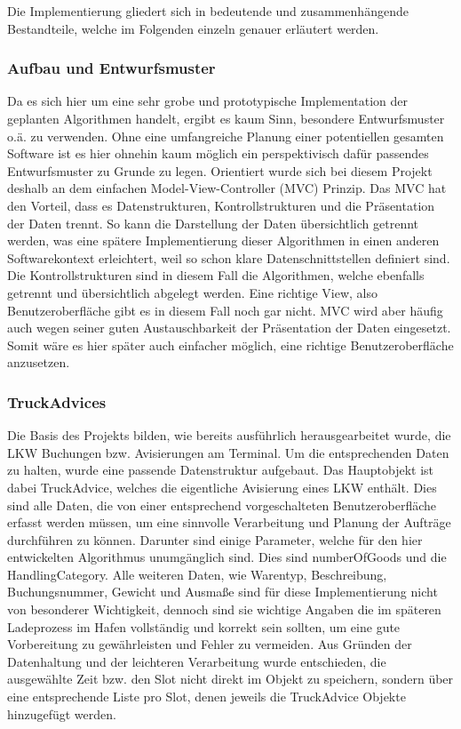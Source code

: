 Die Implementierung gliedert sich in bedeutende und zusammenhängende Bestandteile, welche im Folgenden einzeln genauer erläutert werden.


\subsubsection{Aufbau und Entwurfsmuster}


Da es sich hier um eine sehr grobe und prototypische Implementation der geplanten Algorithmen handelt, ergibt es kaum Sinn, besondere Entwurfsmuster o.ä. zu verwenden. Ohne eine umfangreiche Planung einer potentiellen gesamten Software ist es hier ohnehin kaum möglich ein perspektivisch dafür passendes Entwurfsmuster zu Grunde zu legen. Orientiert wurde sich bei diesem Projekt deshalb an dem einfachen Model-View-Controller (MVC) Prinzip. Das MVC hat den Vorteil, dass es Datenstrukturen, Kontrollstrukturen und die Präsentation der Daten trennt. So kann die Darstellung der Daten übersichtlich getrennt werden, was eine spätere Implementierung dieser Algorithmen in einen anderen Softwarekontext erleichtert, weil so schon klare Datenschnittstellen definiert sind. Die Kontrollstrukturen sind in diesem Fall die Algorithmen, welche ebenfalls getrennt und übersichtlich abgelegt werden. Eine richtige View, also Benutzeroberfläche gibt es in diesem Fall noch gar nicht. MVC wird aber häufig auch wegen seiner guten Austauschbarkeit der Präsentation der Daten eingesetzt. Somit wäre es hier später auch einfacher möglich, eine richtige Benutzeroberfläche anzusetzen.


\subsubsection{TruckAdvices}

Die Basis des Projekts bilden, wie bereits ausführlich herausgearbeitet wurde, die LKW Buchungen bzw. Avisierungen am Terminal. Um die entsprechenden Daten zu halten, wurde eine passende Datenstruktur aufgebaut. Das Hauptobjekt ist dabei TruckAdvice, welches die eigentliche Avisierung eines LKW enthält. Dies sind alle Daten, die von einer entsprechend vorgeschalteten Benutzeroberfläche erfasst werden müssen, um eine sinnvolle Verarbeitung und Planung der Aufträge durchführen zu können. Darunter sind einige Parameter, welche für den hier entwickelten Algorithmus unumgänglich sind. Dies sind numberOfGoods und die HandlingCategory. Alle weiteren Daten, wie Warentyp, Beschreibung, Buchungsnummer, Gewicht und Ausmaße sind für diese Implementierung nicht von besonderer Wichtigkeit, dennoch sind sie wichtige Angaben die im späteren Ladeprozess im Hafen vollständig und korrekt sein sollten, um eine gute Vorbereitung zu gewährleisten und Fehler zu vermeiden. Aus Gründen der Datenhaltung und der leichteren Verarbeitung wurde entschieden, die ausgewählte Zeit bzw. den Slot nicht direkt im Objekt zu speichern, sondern über eine entsprechende Liste pro Slot, denen jeweils die TruckAdvice Objekte hinzugefügt werden.

